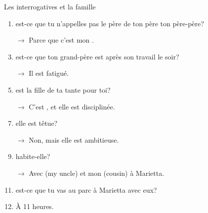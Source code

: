 \begin{frame}{Les interrogatives et la famille }
  \begin{enumerate}
    \item \underline{} est-ce que tu n'appelles pas le père de ton père ton père-père?
    \item[$\to$] Parce que c'est mon \underline{}.
    \item \underline{} est-ce que ton grand-père est après son travail le soir?
    \item[$\to$] Il est fatigué.
    \item \underline{} est la fille de ta tante pour toi?
    \item[$\to$] C'est \underline{}, et elle est disciplinée.
    \item \underline{}elle est têtue?
    \item[$\to$] Non, mais elle est ambitieuse.
    \item \underline{} habite-elle?
    \item[$\to$] Avec \underline{} (my uncle) et mon \underline{} (cousin) à Marietta.
    \item \underline{} est-ce que tu vas au parc à Marietta avec eux?
    \item À 11 heures.
  \end{enumerate}
\end{frame}